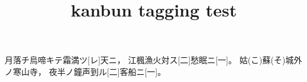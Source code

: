 \documentclass{article}
\title{kanbun tagging test}
\begin{document}
\Kanbun
月落チ烏啼キテ霜満ツ[レ]天ニ，
江楓漁火対ス[二]愁眠ニ[一]。
姑(こ)蘇(そ)城外ノ寒山寺，
夜半ノ鐘声到ル[二]客船ニ[一]。
\EndKanbun
\printkanbun
\end{document}
